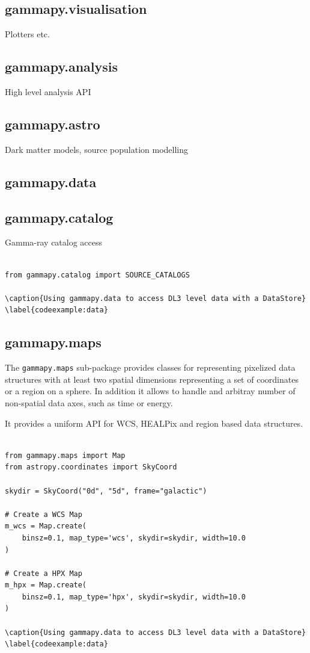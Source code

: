 \subsection{gammapy.visualisation}
Plotters etc.

\subsection{gammapy.analysis}
High level analysis API

\subsection{gammapy.astro}
Dark matter models, source population modelling

\subsection{gammapy.data}

\subsection{gammapy.catalog}
Gamma-ray catalog access

\begin{lstlisting}

from gammapy.catalog import SOURCE_CATALOGS

\caption{Using gammapy.data to access DL3 level data with a DataStore}
\label{codeexample:data}
\end{lstlisting}


\subsection{gammapy.maps}
The \verb|gammapy.maps| sub-package provides classes for representing pixelized
data structures with at least two spatial dimensions representing a set of
coordinates or a region on a sphere. In addition it allows to handle and arbitray
number of non-spatial data axes, such as time or energy.

It provides a uniform API for WCS, HEALPix and region based data structures.

\begin{lstlisting}

from gammapy.maps import Map
from astropy.coordinates import SkyCoord

skydir = SkyCoord("0d", "5d", frame="galactic")

# Create a WCS Map
m_wcs = Map.create(
	binsz=0.1, map_type='wcs', skydir=skydir, width=10.0
)

# Create a HPX Map
m_hpx = Map.create(
	binsz=0.1, map_type='hpx', skydir=skydir, width=10.0
)

\caption{Using gammapy.data to access DL3 level data with a DataStore}
\label{codeexample:data}
\end{lstlisting}


